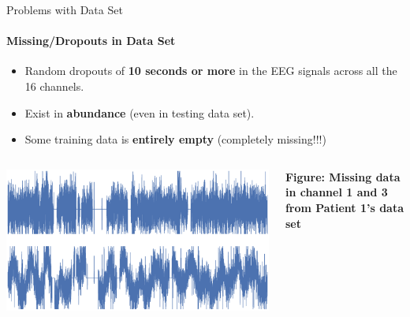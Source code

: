 \documentclass{beamer}
\begin{document}
\begin{frame}{Problems with Data Set}
  \framesubtitle{Missing/Dropouts in Data Set}

  \begin{block}{}
    \begin{itemize}
    \item Random dropouts of \textbf{10 seconds or more} in the EEG signals across all the 16 channels.
    \item Exist in \textbf{abundance} (even in testing data set).
    \item Some training data is \textbf{entirely empty} (completely missing!!!)
    \end{itemize}
  \end{block}

  \begin{columns}
    \includegraphics[scale=0.13]{img/data_drops2.eps}

    \textbf{Figure: Missing data in channel 1 and 3 from Patient 1's data set}
  \end{columns}
\end{frame}
 

  
\end{document}
